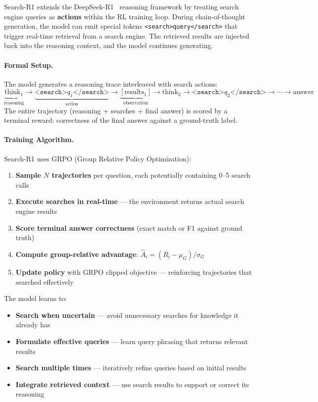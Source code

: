 Search-R1 extends the DeepSeek-R1~\cite{deepseek2025r1} reasoning framework by treating search engine queries as \textbf{actions} within the RL training loop. During chain-of-thought generation, the model can emit special tokens \texttt{<search>query</search>} that trigger real-time retrieval from a search engine. The retrieved results are injected back into the reasoning context, and the model continues generating.

\paragraph{Formal Setup.}
\label{formal-setup.}

The model generates a reasoning trace interleaved with search actions: 
\[
\underbrace{\text{think}_1}_{\text{reasoning}} \to \underbrace{\texttt{<search>}q_1\texttt{</search>}}_{\text{action}} \to \underbrace{[\text{results}_1]}_{\text{observation}} \to \text{think}_2 \to \texttt{<search>}q_2\texttt{</search>} \to \cdots \to \text{answer}
\]
 The entire trajectory (reasoning + searches + final answer) is scored by a terminal reward: correctness of the final answer against a ground-truth label.

\paragraph{Training Algorithm.}
\label{training-algorithm.}

Search-R1 uses GRPO (Group Relative Policy Optimization):

\begin{enumerate}
  \item \textbf{Sample $N$ trajectories} per question, each potentially containing 0--5 search calls
  \item \textbf{Execute searches in real-time} --- the environment returns actual search engine results
  \item \textbf{Score terminal answer correctness} (exact match or F1 against ground truth)
  \item \textbf{Compute group-relative advantage}: $\hat{A}_i = (R_i - \mu_G) / \sigma_G$
  \item \textbf{Update policy} with GRPO clipped objective --- reinforcing trajectories that searched effectively
\end{enumerate}

The model learns to:

\begin{itemize}
  \item \textbf{Search when uncertain} --- avoid unnecessary searches for knowledge it already has
  \item \textbf{Formulate effective queries} --- learn query phrasing that returns relevant results
  \item \textbf{Search multiple times} --- iteratively refine queries based on initial results
  \item \textbf{Integrate retrieved context} --- use search results to support or correct its reasoning
\end{itemize}

